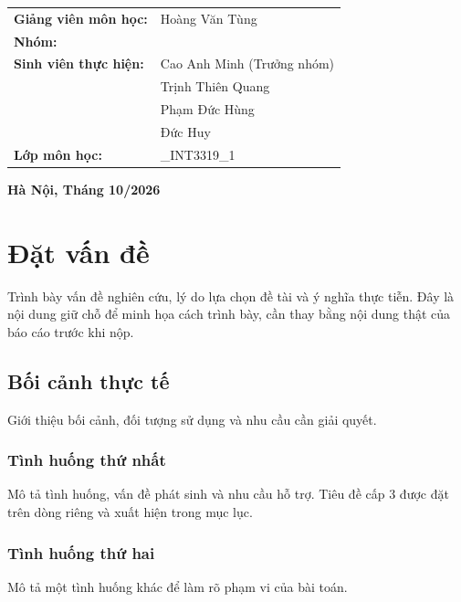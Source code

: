 \documentclass[a4paper,12pt]{article}
\newcommand{\GiangVien}{Hoàng Văn Tùng}
\newcommand{\SoNhom}{10}
\newcommand{\LopMonHoc}{2627_INT3319_1}
\newcommand{\DiaDiemThoiGian}{Hà Nội, Tháng 10/2026}
\begin{document}
\begin{titlepage}
{\renewcommand{\arraystretch}{1.1}
\begin{tabular}{@{}>{\raggedright\arraybackslash\bfseries}p{4.8cm}>{\raggedright\arraybackslash}p{8cm}@{}}
  Giảng viên môn học: & \GiangVien\\
  Nhóm: & \SoNhom\\
  Sinh viên thực hiện: & Cao Anh Minh (Trưởng nhóm)\\
                      & Trịnh Thiên Quang\\
                      & Phạm Đức Hùng\\
                      & Đức Huy\\
  Lớp môn học: & \LopMonHoc
\end{tabular}\par}
\vfill
{\fontsize{13}{17}\selectfont\bfseries\DiaDiemThoiGian\par}
\vspace*{0.5cm}
\end{titlepage}

\tableofcontents
\clearpage
{}

\section{Đặt vấn đề}
Trình bày vấn đề nghiên cứu, lý do lựa chọn đề tài và ý nghĩa thực tiễn.
Đây là nội dung giữ chỗ để minh họa cách trình bày, cần thay bằng nội dung
thật của báo cáo trước khi nộp.

\subsection{Bối cảnh thực tế}
Giới thiệu bối cảnh, đối tượng sử dụng và nhu cầu cần giải quyết.

\subsubsection{Tình huống thứ nhất}
Mô tả tình huống, vấn đề phát sinh và nhu cầu hỗ trợ. Tiêu đề cấp 3
được đặt trên dòng riêng và xuất hiện trong mục lục.

\subsubsection{Tình huống thứ hai}
Mô tả một tình huống khác để làm rõ phạm vi của bài toán.
\end{document}
